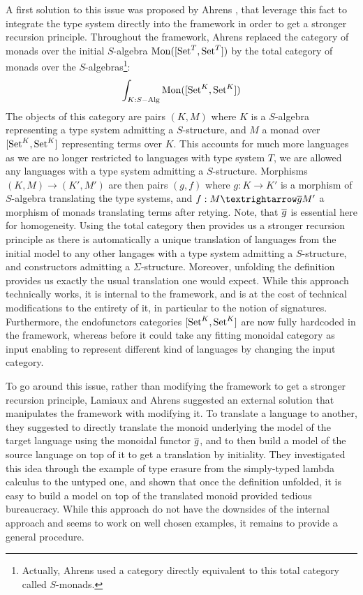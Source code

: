 A first solution to this issue was proposed by Ahrens \cite{ExtendedInitiality12},
that leverage this fact to integrate the type system directly into the framework
in order to get a stronger recursion principle.
Throughout the framework, Ahrens replaced the category of monads over the
initial $S$-algebra $\operatorname{Mon}([\operatorname{Set}^{T},\operatorname{Set}^{T}])$ by the total category of
monads over the $S$-algebras\footnote{
  Actually, Ahrens used a category directly equivalent to this total
  category called $S$-monads.}:
%
\[\int_{K : S-\mathrm{Alg}} \operatorname{Mon}([\operatorname{Set}^K,\operatorname{Set}^K]) \]
%
The objects of this category are pairs $(K,M)$ where $K$ is a $S$-algebra
representing a type system admitting a $S$-structure, and $M$ a monad over
$[\operatorname{Set}^{K},\operatorname{Set}^{K}]$ representing terms over $K$.
This accounts for much more languages as we are no longer restricted to
languages with type system $T$, we are allowed any languages with a type
system admitting a $S$-structure.
Morphisms $(K,M) → (K',M')$ are then pairs $(g,f)$ where $g : K → K'$ is
a morphism of $S$-algebra translating the type systems, and $f : M → \ol{g}M'$
a morphism of monads translating terms after retying.
Note, that $\overline{g}$ is essential here for homogeneity.
Using the total category then provides us a stronger recursion principle as
there is automatically a unique translation of languages from the initial model
to any other langages with a type system admitting a $S$-structure, and constructors admitting a $\Sigma$-structure.
Moreover, unfolding the definition provides us exactly the usual translation one would expect.
While this approach technically works, it is internal to the framework, and
is at the cost of technical modifications to the entirety of it, in
particular to the notion of signatures.
Furthermore, the endofunctors categories $[\operatorname{Set}^K,\operatorname{Set}^K]$ are now fully hardcoded
in the framework, whereas before it could take any fitting monoidal category as input
enabling to represent different kind of languages by changing the input category.

To go around this issue, rather than modifying the framework to get a
stronger recursion principle, Lamiaux and Ahrens \cite[Section 9.4]{IntroductionIS24}
suggested an external solution that manipulates the framework with modifying it.
To translate a language to another, they suggested to directly translate the
monoid underlying the model of the target language using the monoidal
functor $\overline{g}$, and to then build a model of the source language on
top of it to get a translation by initiality.
They investigated this idea through the example of type erasure from the
simply-typed lambda calculus to the untyped one, and shown that once the
definition unfolded, it is easy to build a model on top of the translated
monoid provided tedious bureaucracy.
%
While this approach do not have the downsides of the internal approach and
seems to work on well chosen examples, it remains to provide a general
procedure.

